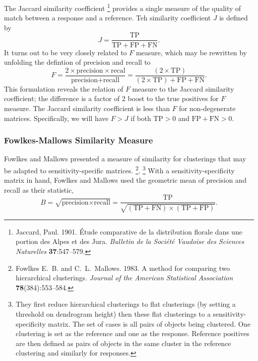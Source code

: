 The Jaccard similarity coefficient%
%
\footnote{Jaccard, Paul. 1901. Étude comparative de la distribution
  florale dans une portion des Alpes et des Jura. {\it Bulletin de la
  Société Vaudoise des Sciences Naturelles} {\bf 37}:547--579.}
%
provides a single measure of the quality of match between a response
and a reference.  Teh similarity coefficient $J$ is defined by
%
\begin{equation}
J = \frac{\mbox{TP}}{\mbox{TP} + \mbox{FP} + \mbox{FN}}.
\end{equation}
%
It turns out to be very closely related to $F$ measure, 
which may be rewritten by unfolding the defintion of precision
and recall to
%
\begin{equation}
F = \frac{2 \times \mbox{precision} \times \mbox{recal}}
          {\mbox{precision} + \mbox{recall}}
= \frac{(2 \times \mbox{TP})}
        {(2 \times \mbox{TP}) + \mbox{FP} + \mbox{FN}}.
\end{equation}
%
This formulation reveals the relation of $F$ measure to the Jaccard
similarity coefficient; the difference is a factor of 2 boost to the
true positives for $F$ measure.  The Jaccard similarity coefficient is
less than $F$ for non-degenerate matrices.  Specifically, we will have
$F > J$ if both $\mbox{TP} > 0$ and $\mbox{FP} + \mbox{FN} > 0$.



\subsubsection{Fowlkes-Mallows Similarity Measure}

Fowlkes and Mallows presented a measure of similarity for clusterings
that may be adapted to sensitivity-specific matrices.%
%
\footnote{Fowlkes E.~B. and C.~L.~Mallows. 1983. A method for
  comparing two hierarchical clusterings. {\it Journal of the American
  Statistical Association} {\bf 78}(384):553--584. }.
%
\footnote{They first reduce hierarchical clusterings to flat
  clusterings (by setting a threshold on dendrogram height) then these
  flat clusterings to a sensitivity-specificity matrix.  The set of
  cases is all pairs of objects being clustered.  One clustering is
  set as the reference and one as the response.  Reference positives
  are then defined as pairs of objects in the same cluster in the
  reference clustering and similarly for responses.}
%
With a sensitivity-specificity matrix in hand, Fowlkes and Mallows
used the geometric mean of precision and recall as their statistic,
%
\begin{equation}
B 
= \sqrt{\mbox{precision} \times \mbox{recall}}
= \frac{\mbox{TP}}{\sqrt{(\mbox{TP} + \mbox{FN}) \times (\mbox{TP} + \mbox{FP})}}.
\end{equation}
%

